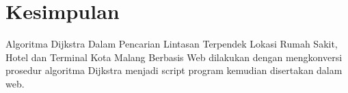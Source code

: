 \documentclass[conference]{IEEEtran}
\begin{document}
\section{Kesimpulan}
Algoritma Dijkstra Dalam Pencarian Lintasan
Terpendek Lokasi Rumah Sakit, Hotel dan Terminal Kota Malang Berbasis Web dilakukan
dengan mengkonversi prosedur algoritma Dijkstra menjadi script program kemudian
disertakan dalam web.




\end{document}
